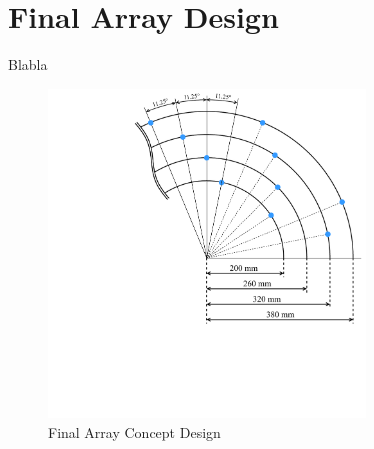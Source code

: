 


\newpage
\section{Final Array Design}
Blabla

\begin{figure}[h]
	\centering
	\includegraphics[width=0.75\textwidth, trim={5.5cm 6.0cm 0 0}]{images/5_array_evaluation/final_array_concept_design.pdf}
	\caption{Final Array Concept Design}
	\label{fig:final_array_concept_design}
\end{figure}
